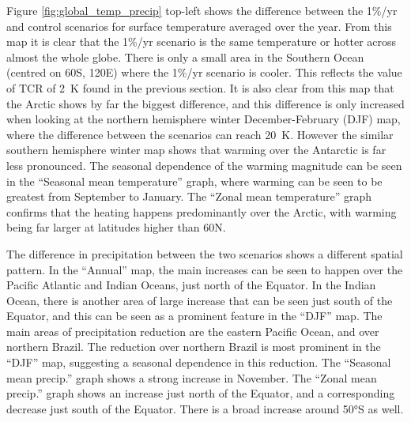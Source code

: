 \documentclass{article}
\begin{document}

Figure \ref{fig:global_temp_precip} top-left shows the difference between the 1\%/yr and control scenarios for surface temperature averaged over the year. From this map it is clear that the 1\%/yr scenario is the same temperature or hotter across almost the whole globe. There is only a small area in the Southern Ocean (centred on 60\textdegree S, 120\textdegree E) where the 1\%/yr scenario is cooler. This reflects the value of TCR of \SI{2}{K} found in the previous section. It is also clear from this map that the Arctic shows by far the biggest difference, and this difference is only increased when looking at the northern hemisphere winter December-February (DJF) map, where the difference between the scenarios can reach \SI{20}{K}. However the similar southern hemisphere winter map shows that warming over the Antarctic is far less pronounced. The seasonal dependence of the warming magnitude can be seen in the ``Seasonal mean temperature'' graph, where warming can be seen to be greatest from September to January. The ``Zonal mean temperature'' graph confirms that the heating happens predominantly over the Arctic, with warming being far larger at latitudes higher than 60\textdegree N.

The difference in precipitation between the two scenarios shows a different spatial pattern. In the ``Annual'' map, the main increases can be seen to happen over the Pacific Atlantic and Indian Oceans, just north of the Equator. In the Indian Ocean, there is another area of large increase that can be seen just south of the Equator, and this can be seen as a prominent feature in the ``DJF'' map. The main areas of precipitation reduction are the eastern Pacific Ocean, and over northern Brazil. The reduction over northern Brazil is most prominent in the ``DJF'' map, suggesting a seasonal dependence in this reduction. The ``Seasonal mean precip.'' graph shows a strong increase in November. The ``Zonal mean precip.'' graph shows an increase just north of the Equator, and a corresponding decrease just south of the Equator. There is a broad increase around 50°S as well.
\end{document}

